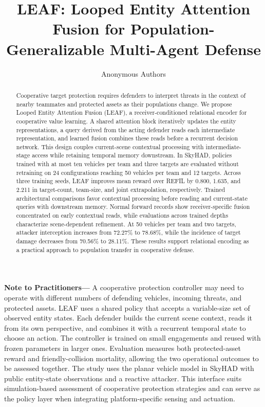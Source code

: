 \documentclass[journal,10pt]{IEEEtran}
\begin{document}
\title{LEAF: Looped Entity Attention Fusion for Population-Generalizable Multi-Agent Defense}
\author{Anonymous Authors}
\maketitle
{}
\begin{abstract}
Cooperative target protection requires defenders to interpret threats in the context of nearby teammates and protected assets as their populations change. We propose Looped Entity Attention Fusion (LEAF), a receiver-conditioned relational encoder for cooperative value learning. A shared attention block iteratively updates the entity representations, a query derived from the acting defender reads each intermediate representation, and learned fusion combines these reads before a recurrent decision network. This design couples current-scene contextual processing with intermediate-stage access while retaining temporal memory downstream. In SkyHAD, policies trained with at most ten vehicles per team and three targets are evaluated without retraining on 24 configurations reaching 50 vehicles per team and 12 targets. Across three training seeds, LEAF improves mean reward over REFIL by 0.800, 1.635, and 2.211 in target-count, team-size, and joint extrapolation, respectively. Trained architectural comparisons favor contextual processing before reading and current-state queries with downstream memory. Normal forward records show receiver-specific fusion concentrated on early contextual reads, while evaluations across trained depths characterize scene-dependent refinement. At 50 vehicles per team and two targets, attacker interception increases from 72.27\% to 78.68\%, while the incidence of target damage decreases from 70.56\% to 28.11\%. These results support relational encoding as a practical approach to population transfer in cooperative defense.
\end{abstract}
\noindent\textbf{Note to Practitioners---}
A cooperative protection controller may need to operate with different numbers of defending vehicles, incoming threats, and protected assets. LEAF uses a shared policy that accepts a variable-size set of observed entity states. Each defender builds the current scene context, reads it from its own perspective, and combines it with a recurrent temporal state to choose an action. The controller is trained on small engagements and reused with frozen parameters in larger ones. Evaluation measures both protected-asset reward and friendly-collision mortality, allowing the two operational outcomes to be assessed together. The study uses the planar vehicle model in SkyHAD with public entity-state observations and a reactive attacker. This interface suits simulation-based assessment of cooperative protection strategies and can serve as the policy layer when integrating platform-specific sensing and actuation.
\end{document}
